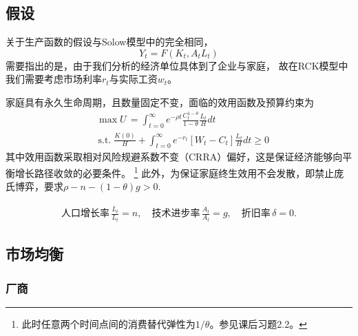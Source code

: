 \documentclass[cn,normal,11pt,black]{elegantnote}
\begin{document}
\subsection{假设}

\begin{definition}[生产函数]
    关于生产函数的假设与Solow模型中的完全相同，
    \begin{equation}
        Y_t = F(K_t, A_t L_t)
    \end{equation}
    需要指出的是，由于我们分析的经济单位具体到了企业与家庭，
    故在RCK模型中我们需要考虑市场利率$r_t$与实际工资$w_t$。
\end{definition}

\begin{definition}[家庭效用函数]
家庭具有永久生命周期，且数量固定不变，面临的效用函数及预算约束为
    \begin{align}
        & \max U \,  = \int_{t=0}^{\infty} e^{-\rho t} \frac{C_t^{1-\theta}}{1-\theta} \frac{L_t}{H} dt \\
        & \, \mathrm{s.t.} \; \frac{K(0)}{H}+\int_{t=0}^{\infty} e^{-r_t}[W_t-C_t] \frac{L_t}{H} d t \geq 0
    \end{align}
    其中效用函数采取相对风险规避系数不变（CRRA）偏好，这是保证经济能够向平衡增长路径收敛的必要条件。
    \footnote{此时任意两个时间点间的消费替代弹性为$1/\theta$。参见课后习题2.2。}
    此外，为保证家庭终生效用不会发散，即禁止庞氏博弈，要求$\rho - n -(1-\theta)g > 0$.
\end{definition}

\begin{definition}[投入要素]
\begin{align}
    \mbox{人口增长率} \, \frac{\dot{L_t}}{L_t} = n, \quad
    \mbox{技术进步率} \, \frac{\dot{A}_t}{A_t} = g, \quad
    \mbox{折旧率} \, \delta = 0.
\end{align}
\end{definition}


\subsection{市场均衡}

\subsubsection*{厂商}
\end{document}
